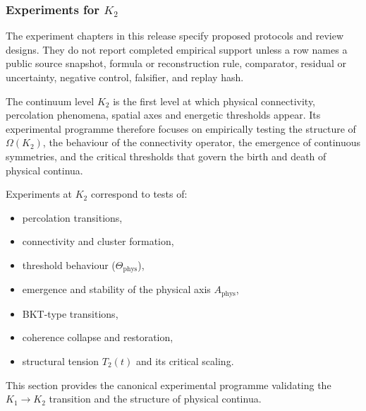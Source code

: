 
\subsubsection{Experiments for \texorpdfstring{$K_2$}{K_2}}

The experiment chapters in this release specify proposed protocols and review designs. They do not report completed empirical support unless a row names a public source snapshot, formula or reconstruction rule, comparator, residual or uncertainty, negative control, falsifier, and replay hash.
\label{sec:experiments-k2}

The continuum level $K_2$ is the first level at which physical connectivity,
percolation phenomena, spatial axes and energetic thresholds appear.
Its experimental programme therefore focuses on empirically testing the
structure of $\Omega(K_2)$, the behaviour of the connectivity operator,
the emergence of continuous symmetries, and the critical thresholds that
govern the birth and death of physical continua.

Experiments at $K_2$ correspond to tests of:
\begin{itemize}
    \item percolation transitions,
    \item connectivity and cluster formation,
    \item threshold behaviour ($\Theta_{\mathrm{phys}}$),
    \item emergence and stability of the physical axis $A_{\mathrm{phys}}$,
    \item BKT-type transitions,
    \item coherence collapse and restoration,
    \item structural tension $T_2(t)$ and its critical scaling.
\end{itemize}

This section provides the canonical experimental programme validating the
$K_1 \rightarrow K_2$ transition and the structure of physical continua.



